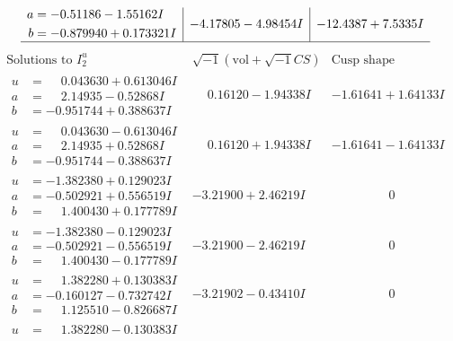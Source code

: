 \documentclass[1p]{elsarticle_modified}
\theoremstyle{definition}
\newcommand{\I}{\sqrt{-1}}
\begin{document}
$$\begin{array}{c|c|c}
\begin{aligned}
a &= -0.51186 - 1.55162 I \\
b &= -0.879940 + 0.173321 I\end{aligned}
 & -4.17805 - 4.98454 I & -12.4387 + 7.5335 I\\
 \hline 
 \end{array}$$\newpage$$\begin{array}{c|c|c}  
\text{Solutions to }I^u_{2}& \I (\text{vol} + \sqrt{-1}CS) & \text{Cusp shape}\\
 \hline 
\begin{aligned}
u &= \phantom{-}0.043630 + 0.613046 I \\
a &= \phantom{-}2.14935 - 0.52868 I \\
b &= -0.951744 + 0.388637 I\end{aligned}
 & \phantom{-}0.16120 - 1.94338 I & -1.61641 + 1.64133 I \\ \hline\begin{aligned}
u &= \phantom{-}0.043630 - 0.613046 I \\
a &= \phantom{-}2.14935 + 0.52868 I \\
b &= -0.951744 - 0.388637 I\end{aligned}
 & \phantom{-}0.16120 + 1.94338 I & -1.61641 - 1.64133 I \\ \hline\begin{aligned}
u &= -1.382380 + 0.129023 I \\
a &= -0.502921 + 0.556519 I \\
b &= \phantom{-}1.400430 + 0.177789 I\end{aligned}
 & -3.21900 + 2.46219 I & \phantom{-0.000000 } 0 \\ \hline\begin{aligned}
u &= -1.382380 - 0.129023 I \\
a &= -0.502921 - 0.556519 I \\
b &= \phantom{-}1.400430 - 0.177789 I\end{aligned}
 & -3.21900 - 2.46219 I & \phantom{-0.000000 } 0 \\ \hline\begin{aligned}
u &= \phantom{-}1.382280 + 0.130383 I \\
a &= -0.160127 - 0.732742 I \\
b &= \phantom{-}1.125510 - 0.826687 I\end{aligned}
 & -3.21902 - 0.43410 I & \phantom{-0.000000 } 0 \\ \hline\begin{aligned}
u &= \phantom{-}1.382280 - 0.130383 I \\

\end{aligned}
\end{array}$$
\end{document}
